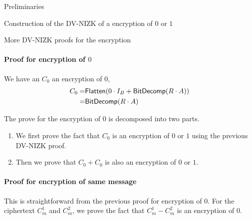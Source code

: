 \begin{section}{Preliminaries}
\begin{subsection}{Construction of the DV-NIZK of a encryption of $0$ or $1$}
  \end{subsection}


  \begin{subsection}{More DV-NIZK proofs for the encryption}
    
    \paragraph{Proof for encryption of $0$}
    We have an $C_0$ an encryption of $0$, 
    \begin{align*}
      C_0  = & {\mathsf{Flatten}}( 0 \cdot I_B + {\mathsf{BitDecomp}}(R \cdot A))\\
      = & {\mathsf{BitDecomp}}(R \cdot A)
    \end{align*}

    The prove for the encryption of $0$ is decomposed into two parts.
    \begin{enumerate}
    \item We first prove the fact that $C_0$ is an encryption of $0$ or $1$ using the previous DV-NIZK proof.
    \item Then we prove that $C_0 + C_0$ is also an encryption of $0$ or $1$.
    \end{enumerate}

    \paragraph{Proof for encryption of same message}
    This is straightforward from the previous proof for encryption of $0$. For the ciphertext $C_m^1$ and $C_m^2$, we prove the fact that $C_m^1 - C_m^2$ is an encryption of $0$.

    
  \end{subsection}



\end{section}
